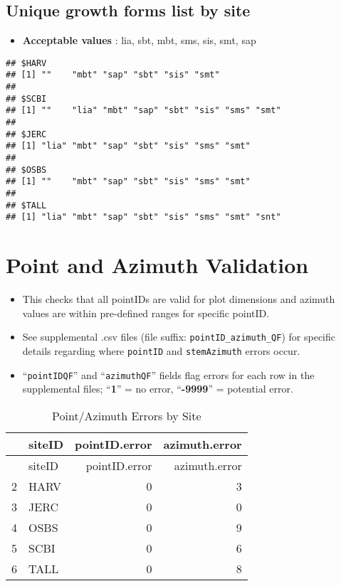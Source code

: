 \documentclass[]{article}
\begin{document}
\subsection{Unique growth forms list by
site}\label{unique-growth-forms-list-by-site}

\begin{itemize}
\itemsep1pt\parskip0pt
\item
  \textbf{Acceptable values} : lia, sbt, mbt, sms, sis, smt, sap
\end{itemize}

\begin{verbatim}
## $HARV
## [1] ""    "mbt" "sap" "sbt" "sis" "smt"
## 
## $SCBI
## [1] ""    "lia" "mbt" "sap" "sbt" "sis" "sms" "smt"
## 
## $JERC
## [1] "lia" "mbt" "sap" "sbt" "sis" "sms" "smt"
## 
## $OSBS
## [1] ""    "mbt" "sap" "sbt" "sis" "sms" "smt"
## 
## $TALL
## [1] "lia" "mbt" "sap" "sbt" "sis" "sms" "smt" "snt"
\end{verbatim}

\section{Point and Azimuth
Validation}\label{point-and-azimuth-validation}

\begin{itemize}
\itemsep1pt\parskip0pt
\item
  This checks that all pointIDs are valid for plot dimensions and
  azimuth values are within pre-defined ranges for specific pointID.
\item
  See supplemental .csv files (file suffix:
  \texttt{pointID\_azimuth\_QF}) for specific details regarding where
  \texttt{pointID} and \texttt{stemAzimuth} errors occur.\\
\item
  ``\texttt{pointIDQF}'' and ``\texttt{azimuthQF}'' fields flag errors
  for each row in the supplemental files; ``\textbf{1}'' = no error,
  ``\textbf{-9999}'' = potential error.
\end{itemize}

\begin{longtable}[c]{@{}llrr@{}}
\caption{Point/Azimuth Errors by Site}\tabularnewline
\toprule
& siteID & pointID.error & azimuth.error\tabularnewline
\midrule
\endfirsthead
\toprule
& siteID & pointID.error & azimuth.error\tabularnewline
\midrule
\endhead
2 & HARV & 0 & 3\tabularnewline
3 & JERC & 0 & 0\tabularnewline
4 & OSBS & 0 & 9\tabularnewline
5 & SCBI & 0 & 6\tabularnewline
6 & TALL & 0 & 8\tabularnewline
\bottomrule
\end{longtable}
\end{document}
